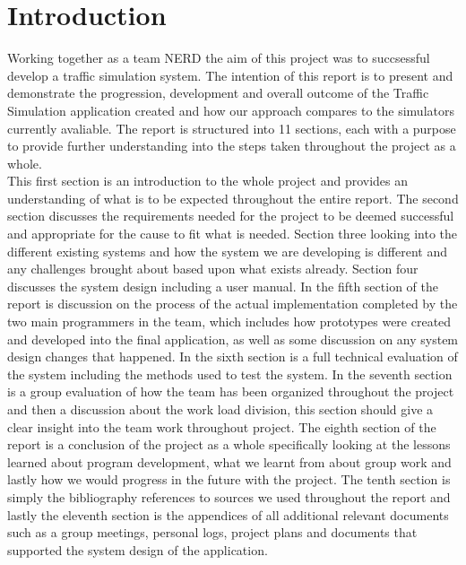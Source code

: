 \documentclass[11pt]{article}
\begin{document}
	\section{Introduction} %
Working together as a team NERD the aim of this project was to succsessful develop a traffic simulation system. The intention of this report is to present and demonstrate the progression, development and overall outcome of the Traffic Simulation application created and how our approach compares to the simulators currently avaliable. 
The report is structured into 11 sections, each with a purpose to provide further understanding into the steps taken throughout the project as a whole. 
	\\ This first section is an introduction to the whole project and provides an understanding of what is to be expected throughout the entire report. The second section discusses the requirements needed for the project to be deemed successful and appropriate for the cause to fit what is needed. Section three looking into the different existing systems and how the system we are developing is different and any challenges brought about based upon what exists already. Section four discusses the system design including a user manual. In the fifth section of the report is discussion on the process of the actual implementation completed by the two main programmers in the team, which includes how prototypes were created and developed into the final application, as well as some discussion on any system design changes that happened. In the sixth section is a full technical evaluation of the system including the methods used to test the system. In the seventh section is a group evaluation of how the team has been organized throughout the project and then a discussion about the work load division, this section should give a clear insight into the team work throughout project. The eighth section of the report is a conclusion of the project as a whole specifically looking at the lessons learned about program development, what we learnt from about group work and lastly how we would progress in the future with the project. The tenth section is simply the bibliography references to sources we used throughout the report and lastly the eleventh section is the appendices of all additional relevant documents such as a group meetings, personal logs, project plans and documents that supported the system design of the application.\\
	
\end{document}
